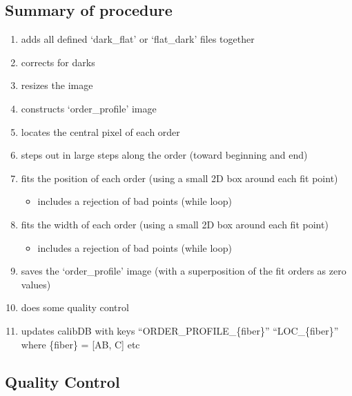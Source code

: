 \subsection{Summary of procedure}
\begin{enumerate}
\item adds all defined `dark\_flat' or `flat\_dark' files together
\item corrects for darks
\item resizes the image
\item constructs `order\_profile' image
\item locates the central pixel of each order
\item steps out in large steps along the order (toward beginning and end)
\item fits the position of each order (using a small 2D box around each fit point)
	\begin{itemize}
	\item includes a rejection of bad points (while loop)
	\end{itemize}
\item fits the width of each order (using a small 2D box around each fit point)
	\begin{itemize}
	\item includes a rejection of bad points (while loop)
	\end{itemize}
\item saves the `order\_profile' image (with a superposition of the fit orders as zero values)
\item does some quality control
\item updates calibDB with keys ``ORDER\_PROFILE\_\{fiber\}'' ``LOC\_\{fiber\}'' where \{fiber\} = [AB, C] etc
\end{enumerate}



\subsection{Quality Control}

